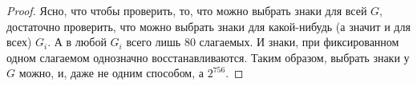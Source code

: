 \documentclass[a4paper,12pt]{amsart}
\theoremstyle{plain}
\newtheorem{theorem}{Теорема}
\theoremstyle{remark}
\theoremstyle{definition}
\newtheorem{definition}{Определение}
\begin{document}
\begin{proof}
 Ясно, что чтобы проверить, то, что можно выбрать знаки для всей $G$, достаточно проверить, что можно выбрать знаки для какой-нибудь (а значит и для всех) $G_i$. А в любой $G_i$ всего лишь $80$ слагаемых. И знаки, при фиксированном одном слагаемом однозначно восстанавливаются. Таким образом, выбрать знаки у $G$ можно, и, даже не одним способом, а $2^{756}$.
\end{proof}



\begin{comment}
\begin{definition}
    Назовем тройку корней $\alpha,\beta,\gamma$ $\pi$\emph{-тройкой}, если корни можно переименовать так, что $\angle(\alpha,\beta)=\pi$,  $\angle(\alpha,\gamma)=\pi/2$, $\angle(\gamma,\beta)=\pi/2$.
\end{definition}
Множество $\pi$-троек в $E_7$ назовем $\Pi$


$$F_2 = \sum(\text{сумма }\pi\text{-уравнений из }D_6)(\text{корень}\bot D_6) + \sum_{(\alpha,\beta,\gamma) \in A_3}v_{\alpha}v_{\beta}v_{\gamma}$$

$$F_2 = \sum_{(\alpha, \beta, \gamma) \in \Pi}v_{\alpha}v_{\beta}v_{\gamma} + \sum_{(\alpha,\beta,\gamma) \in A_3}v_{\alpha}v_{\beta}v_{\gamma} + \sum{v_{}}$$
\begin{theorem}
Пусть $\alpha$ --- ненулевой корень.
    \begin{multline*}
        \frac{\partial F_2}{\partial v_{\alpha}} = \text{линейная комбинация $\pi/2$, $\pi$ и $2\pi/3$-уравнений},\\
         \text{построенных по квадратам из серии } s(\rho, \alpha)|_{E_7}
    \end{multline*}
\end{theorem}
\begin{proof}
Рассмотрим слагаемое, соответствующее $\pi$-тройке $\alpha,\beta,\gamma$.
\end{proof}

\end{comment}
\end{document}
